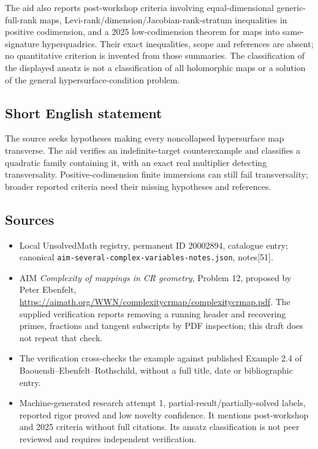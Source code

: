 \documentclass[11pt]{article}
\begin{document}
The aid also reports post-workshop criteria involving equal-dimensional generic-full-rank maps, Levi-rank/dimension/Jacobian-rank-stratum inequalities in positive codimension, and a 2025 low-codimension theorem for maps into same-signature hyperquadrics. Their exact inequalities, scope and references are absent; no quantitative criterion is invented from those summaries. The classification of the displayed ansatz is not a classification of all holomorphic maps or a solution of the general hypersurface-condition problem.
\subsection{Short English statement}
The source seeks hypotheses making every noncollapsed hypersurface map transverse. The aid verifies an indefinite-target counterexample and classifies a quadratic family containing it, with an exact real multiplier detecting transversality. Positive-codimension finite immersions can still fail transversality; broader reported criteria need their missing hypotheses and references.
\subsection{Sources}
\begin{itemize}
\item Local UnsolvedMath registry, permanent ID 20002894, catalogue entry; canonical \texttt{aim-several-complex-variables-notes.json}, notes[51].
\item AIM \emph{Complexity of mappings in CR geometry}, Problem 12, proposed by Peter Ebenfelt, \url{https://aimath.org/WWN/complexitycrmap/complexitycrmap.pdf}. The supplied verification reports removing a running header and recovering primes, fractions and tangent subscripts by PDF inspection; this draft does not repeat that check.
\item The verification cross-checks the example against published Example 2.4 of Baouendi--Ebenfelt--Rothschild, without a full title, date or bibliographic entry.
\item Machine-generated research attempt 1, partial-result/partially-solved labels, reported rigor proved and low novelty confidence. It mentions post-workshop and 2025 criteria without full citations. Its ansatz classification is not peer reviewed and requires independent verification.
\end{itemize}
\end{document}
